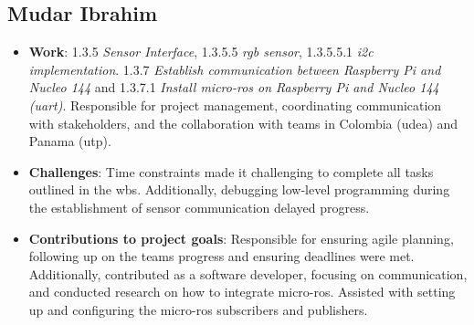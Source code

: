 \subsection*{Mudar Ibrahim}
\begin{itemize}
    \item \textbf{Work}: 1.3.5 \textit{Sensor Interface}, 1.3.5.5 \textit{\acs{rgb} sensor}, 1.3.5.5.1 \textit{\ac{i2c} implementation}. 1.3.7 \textit{Establish communication between Raspberry Pi and Nucleo 144} and 1.3.7.1 \textit{Install \acs{micro-ros} on Raspberry Pi and Nucleo 144 (\ac{uart})}.
    Responsible for project management, coordinating communication with stakeholders, and the collaboration with teams in Colombia (\ac{udea}) and Panama (\ac{utp}).
   
    \item \textbf{Challenges}: Time constraints made it challenging to complete all tasks outlined in the \ac{wbs}. Additionally, debugging low-level programming during the establishment of sensor communication delayed progress. 
    \item \textbf{Contributions to project goals}: Responsible for ensuring agile planning, following up on the teams progress and ensuring deadlines were met. Additionally, contributed as a software developer, focusing on communication, and conducted research on how to integrate \ac{micro-ros}. Assisted with setting up and configuring the \ac{micro-ros} subscribers and publishers.
\end{itemize}
